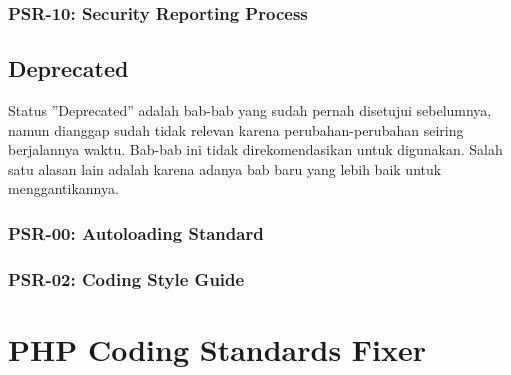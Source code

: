 \subsubsection{PSR-10: Security Reporting Process}
\label{subsubsec:psr10}


\subsection{Deprecated}
\label{subsec:deprecated}
Status ''Deprecated'' adalah bab-bab yang sudah pernah disetujui sebelumnya, namun dianggap sudah tidak relevan karena perubahan-perubahan seiring berjalannya waktu. Bab-bab ini tidak direkomendasikan untuk digunakan. Salah satu alasan lain adalah karena adanya bab baru yang lebih baik untuk menggantikannya.

\subsubsection{PSR-00: Autoloading Standard}
\label{subsubsec:psr00}

\subsubsection{PSR-02: Coding Style Guide}
\label{subsubsec:psr02}



\section{PHP Coding Standards Fixer}
\label{sec:phplinter}
 
